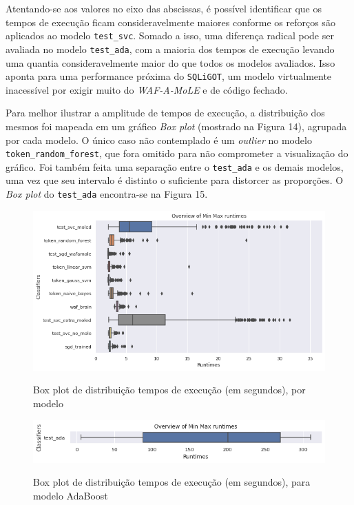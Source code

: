 Atentando-se aos valores no eixo das abscissas, é possível identificar que os tempos de execução ficam consideravelmente maiores conforme os reforços são aplicados ao modelo \verb+test_svc+. Somado a isso, uma diferença radical pode ser avaliada no modelo \verb+test_ada+, com a maioria dos tempos de execução levando uma quantia consideravelmente maior do que todos os modelos avaliados. Isso aponta para uma performance próxima do \verb+SQLiGOT+, um modelo virtualmente inacessível por exigir muito do \textit{WAF-A-MoLE} e de código fechado.

Para melhor ilustrar a amplitude de tempos de execução, a distribuição dos mesmos foi mapeada em um gráfico \textit{Box plot} (mostrado na Figura 14), agrupada por cada modelo. O único caso não contemplado é um \textit{outlier} no modelo \verb+token_random_forest+, que fora omitido para não comprometer a visualização do gráfico. Foi também feita uma separação entre o \verb+test_ada+ e os demais modelos, uma vez que seu intervalo é distinto o suficiente para distorcer as proporções. O \textit{Box plot} do \verb+test_ada+ encontra-se na Figura 15.

\begin{figure}[ht]
    \centering
    \caption{Box plot de distribuição tempos de execução (em segundos), por modelo}
    \includegraphics[width=18cm]{figuras/graficos/min_max_all.png} 
    \label{fig:min-max-all} 
\end{figure}

\begin{figure}[ht]
    \centering
    \caption{Box plot de distribuição tempos de execução (em segundos), para modelo AdaBoost}
    \includegraphics[width=18cm]{figuras/graficos/min_max_ada.png} 
    \label{fig:min-max-ada} 
\end{figure}

